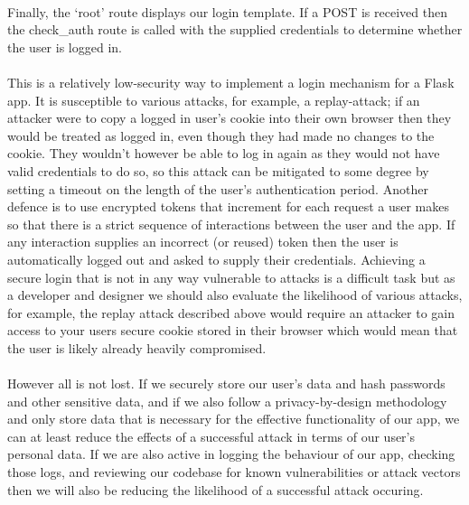 \documentclass[12pt, a4paper, oneside]{book}
\begin{document}
\paragraph{} Finally, the `root' route displays our login template. If a POST is received then the check\_auth route is called with the supplied credentials to determine whether the user is logged in.

\paragraph{} This is a relatively low-security way to implement a login mechanism for a Flask app. It is susceptible to various attacks, for example, a replay-attack; if an attacker were to copy a logged in user's cookie into their own browser then they would be treated as logged in, even though they had made no changes to the cookie. They wouldn't however be able to log in again as they would not have valid credentials to do so, so this attack can be mitigated to some degree by setting a timeout on the length of the user's authentication period. Another defence is to use encrypted tokens that increment for each request a user makes so that there is a strict sequence of interactions between the user and the app. If any interaction supplies an incorrect (or reused) token then the user is automatically logged out and asked to supply their credentials. Achieving a secure login that is not in any way vulnerable to attacks is a difficult task but as a developer and designer we should also evaluate the likelihood of various attacks, for example, the replay attack described above would require an attacker to gain access to your users secure cookie stored in their browser which would mean that the user is likely already heavily compromised.

\paragraph{} However all is not lost. If we securely store our user's data and hash passwords and other sensitive data, and if we also follow a privacy-by-design methodology and only store data that is necessary for the effective functionality of our app, we can at least reduce the effects of a successful attack in terms of our user's personal data. If we are also active in logging the behaviour of our app, checking those logs, and reviewing our codebase for known vulnerabilities or attack vectors then we will also be reducing the likelihood of a successful attack occuring.
\end{document}
